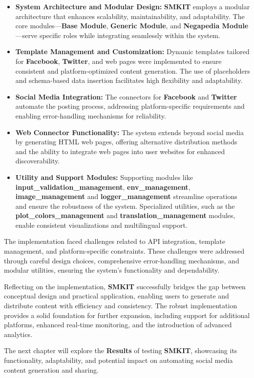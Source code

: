 \begin{itemize}
    \item \textbf{System Architecture and Modular Design:} \textbf{SMKIT} employs a modular architecture that enhances scalability, maintainability, and adaptability. The core modules—\textbf{Base Module}, \textbf{Generic Module}, and \textbf{Negapedia Module}—serve specific roles while integrating seamlessly within the system.
    \item \textbf{Template Management and Customization:} Dynamic templates tailored for \textbf{Facebook}, \textbf{Twitter}, and web pages were implemented to ensure consistent and platform-optimized content generation. The use of placeholders and schema-based data insertion facilitates high flexibility and adaptability.
    \item \textbf{Social Media Integration:} The connectors for \textbf{Facebook} and \textbf{Twitter} automate the posting process, addressing platform-specific requirements and enabling error-handling mechanisms for reliability.
    \item \textbf{Web Connector Functionality:} The system extends beyond social media by generating HTML web pages, offering alternative distribution methods and the ability to integrate web pages into user websites for enhanced discoverability.
    \item \textbf{Utility and Support Modules:} Supporting modules like \textbf{input\_validation\_management}, \textbf{env\_management}, \textbf{image\_management} and \textbf{logger\_management} streamline operations and ensure the robustness of the system. Specialized utilities, such as the \textbf{plot\_colors\_management} and \textbf{translation\_management} modules, enable consistent visualizations and multilingual support.
\end{itemize}

The implementation faced challenges related to API integration, template management, and platform-specific constraints. These challenges were addressed through careful design choices, comprehensive error-handling mechanisms, and modular utilities, ensuring the system's functionality and dependability.

Reflecting on the implementation, \textbf{SMKIT} successfully bridges the gap between conceptual design and practical application, enabling users to generate and distribute content with efficiency and consistency. The robust implementation provides a solid foundation for further expansion, including support for additional platforms, enhanced real-time monitoring, and the introduction of advanced analytics.

The next chapter will explore the \textbf{Results} of testing \textbf{SMKIT}, showcasing its functionality, adaptability, and potential impact on automating social media content generation and sharing.
